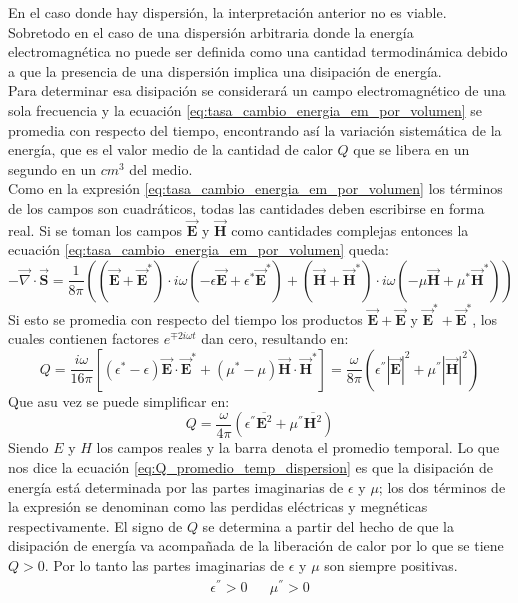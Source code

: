 \documentclass[../tesis_main_file.tex]{subfiles}
\begin{document}
En el caso donde hay dispersión, la interpretación anterior no es viable. Sobretodo en el caso de una dispersión arbitraria donde la energía electromagnética no puede ser definida como una cantidad termodinámica debido a que la presencia de una dispersión implica una disipación de energía.\\
Para determinar esa disipación se considerará un campo electromagnético de una sola frecuencia y la ecuación \ref{eq:tasa_cambio_energia_em_por_volumen} se promedia con respecto del tiempo, encontrando así la variación sistemática de la energía, que es el valor medio de la cantidad de calor $Q$ que se libera en un segundo en un $cm^3$ del medio.\\
Como en la expresión \ref{eq:tasa_cambio_energia_em_por_volumen} los términos de los campos son cuadráticos, todas las cantidades deben escribirse en forma real. Si se toman los campos $\overrightarrow{\textbf{E}}$ y $\overrightarrow{\textbf{H}}$ como cantidades complejas entonces la ecuación \ref{eq:tasa_cambio_energia_em_por_volumen} queda:
\begin{equation}
\label{eq:tasa_energia_em_compleja}
- \overrightarrow{\nabla} \cdot \overrightarrow{\textbf{S}} = \frac{1}{8\pi}\left((\overrightarrow{\textbf{E}} + \overrightarrow{\textbf{E}}^*)\cdot i\omega(-\epsilon \overrightarrow{\textbf{E}}+\epsilon ^* \overrightarrow{\textbf{E}}^*)+ (\overrightarrow{\textbf{H}} + \overrightarrow{\textbf{H}}^*)\cdot i\omega(-\mu \overrightarrow{\textbf{H}}+\mu ^* \overrightarrow{\textbf{H}}^*)\right)
\end{equation}
Si esto se promedia con respecto del tiempo los productos $\overrightarrow{\textbf{E}} + \overrightarrow{\textbf{E}}$ y $\overrightarrow{\textbf{E}}^* + \overrightarrow{\textbf{E}}^*$, los cuales contienen factores $e^{\mp2i\omega t}$ dan cero, resultando en:
\begin{equation}
Q =\frac{i\omega}{16\pi}\left[(\epsilon ^* -\epsilon)\overrightarrow{\textbf{E}} \cdot \overrightarrow{\textbf{E}}^* + (\mu ^* - \mu)\overrightarrow{\textbf{H}} \cdot \overrightarrow{\textbf{H}}^*\right]= \frac{\omega}{8\pi}\left(\epsilon ^{''}|\overrightarrow{\textbf{E}}|^2 + \mu ^{''}|\overrightarrow{\textbf{H}}|^2\right)
\end{equation}
Que asu vez se puede simplificar en:
\begin{equation}
\label{eq:Q_promedio_temp_dispersion}
Q =\frac{\omega}{4\pi}\left(\epsilon ^{''}\overline{\textbf{E}^2} + \mu ^{''} \overline{\textbf{H}^2}\right)
\end{equation}
Siendo $E$ y $H$ los campos reales y la barra denota el promedio temporal.
Lo que nos dice la ecuación \ref{eq:Q_promedio_temp_dispersion} es que la disipación de energía está determinada por las partes imaginarias de $\epsilon$ y  $\mu$; los dos términos de la expresión se denominan como las perdidas eléctricas y megnéticas respectivamente. El signo de $Q$ se determina a partir del hecho de que la disipación de energía va acompañada de la liberación de calor por lo que se tiene $Q>0$. Por lo tanto las partes imaginarias de $\epsilon$ y $\mu$ son siempre positivas.
\begin{align}
\epsilon^{''} > 0 & &\mu^{''} > 0
\end{align}
\end{document}
